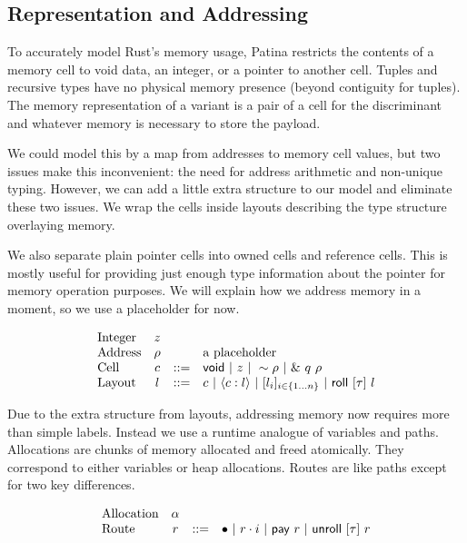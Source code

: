 \subsection*{Representation and Addressing}

To accurately model Rust's memory usage, Patina restricts
the contents of a memory cell to void data, an integer, or a pointer to another cell.
Tuples and recursive types have no physical memory presence (beyond contiguity for tuples).
The memory representation of a variant is a pair of a cell for the discriminant
and whatever memory is necessary to store the payload.

We could model this by a map from addresses to memory cell values,
but two issues make this inconvenient: the need for address arithmetic
and non-unique typing. However, we can add a little extra structure to
our model and eliminate these two issues. We wrap the cells inside
layouts describing the type structure overlaying memory.

We also separate plain pointer cells into owned cells and reference cells.
This is mostly useful for providing just enough type information about the pointer
for memory operation purposes. We will explain how we address memory in a moment,
so we use a placeholder for now.

\[
\begin{array}{lccl}
\textrm{Integer} & z & & \\
\textrm{Address} & \rho & & \textrm{a placeholder} \\
\textrm{Cell} & c & ::= & \mathsf{void} ~|~ z ~|~ \sim{\rho} ~|~ \&~{q~\rho} \\
\textrm{Layout} & l & ::= & c ~|~ \langle{{c}:{l}}\rangle ~|~ 
			       [{{l}_{i}}]_{{i} \in \{1 \ldots {n}\} } ~|~ \mathsf{roll}~[{\tau}]~{l} \\
\end{array}
\]

Due to the extra structure from layouts, addressing memory now requires
more than simple labels. Instead we use a runtime analogue of variables and paths.
Allocations are chunks of memory allocated and freed atomically.
They correspond to either variables or heap allocations.
Routes are like paths except for two key differences.

\[
\begin{array}{lccl}
\textrm{Allocation} & \alpha & & \\
\textrm{Route} & r & ::= & \bullet ~|~ {r}\cdot{i} ~|~ \mathsf{pay}~{r} ~|~ \mathsf{unroll}~[{\tau}]~{r} \\
\end{array}
\]

